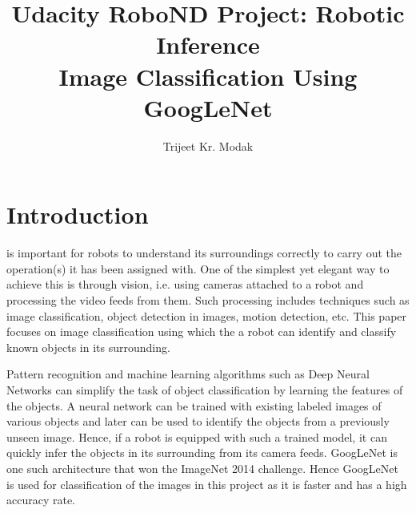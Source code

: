 \documentclass[10pt,journal,compsoc]{IEEEtran}
\begin{document}
\title{Udacity RoboND Project: Robotic Inference \\
    \huge Image Classification Using GoogLeNet}

\author{Trijeet Kr. Modak}

%
{}


\maketitle
\IEEEdisplaynontitleabstractindextext
\IEEEpeerreviewmaketitle
\section{Introduction}
\label{sec:introduction}

 is important for robots to understand its surroundings correctly to carry out the operation(s) it has been assigned with. One of the simplest yet elegant way to achieve this is through vision, i.e. using cameras attached to a robot and processing the video feeds from them. Such processing includes techniques such as image classification, object detection in images, motion detection, etc. This paper focuses on image classification using which the a robot can identify and classify known objects in its surrounding.

Pattern recognition and machine learning \cite{nasrabadi2007pattern} algorithms such as Deep Neural Networks \cite{schmidhuber2015deep} can simplify the task of object classification by learning the features of the objects. A neural network can be trained with existing labeled images of various objects and later can be used to identify the objects from a previously unseen image. Hence, if a robot is equipped with such a trained model, it can quickly infer the objects in its surrounding from its camera feeds. GoogLeNet \cite{szegedy2015going} is one such architecture that won the ImageNet \cite{deng2009imagenet} 2014 challenge. Hence GoogLeNet is used for classification of the images in this project as it is faster and has a high accuracy rate.
\end{document}
